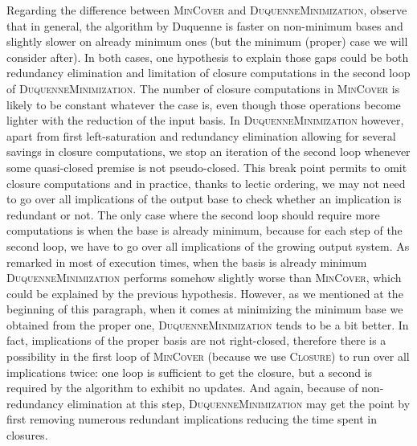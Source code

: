 Regarding the difference between \textsc{MinCover} and \textsc{DuquenneMinimization}, observe that in general, the algorithm by Duquenne is faster on non-minimum bases and slightly slower on already minimum ones (but the minimum (proper) case we will consider after). In both cases, one hypothesis to explain those gaps could be both redundancy elimination and limitation of closure computations in the second loop of \textsc{DuquenneMinimization}. The number of closure computations in \textsc{MinCover} is likely to be constant whatever the case is, even though
those operations become lighter with the reduction of the input basis. In \textsc{DuquenneMinimization} however, apart from first left-saturation and
redundancy elimination allowing for several savings in closure computations, we stop an iteration of the second loop whenever some quasi-closed premise is not
pseudo-closed. This break point permits to omit closure computations and in practice, thanks to lectic ordering, we may not need to go over all implications of the output base to check whether an implication is redundant or not. The only case where the second loop should require more computations is when the base is already minimum, because for each step of the second loop, we have to go over all implications of the growing output system. As remarked in most of execution times, when the basis is already minimum \textsc{DuquenneMinimization} performs somehow slightly worse than 
\textsc{MinCover}, which could be explained by the previous hypothesis. However,
as we mentioned at the beginning of this paragraph, when it comes at minimizing
the minimum base we obtained from the proper one, \textsc{DuquenneMinimization}
tends to be a bit better. In fact, implications of the proper basis are not
right-closed, therefore there is a possibility in the first loop of \textsc{MinCover} (because we use \textsc{Closure}) to run over all implications
twice: one loop is sufficient to get the closure, but a second is required by the algorithm to exhibit no updates. And again, because of non-redundancy elimination at this step, \textsc{DuquenneMinimization} may get the point by first removing numerous redundant implications reducing the time spent in closures.

\vspace{1.2em}



